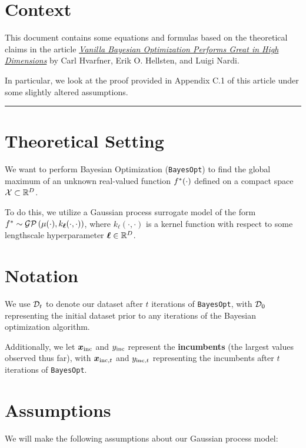 \documentclass[11pt]{article}
\numberwithin{figure}{section}
\numberwithin{equation}{section}
\def\BayesOpt{\texttt{BayesOpt}}
\def\calGP{\mathcal{GP}}
\newcommand{\bs}[1]{\boldsymbol{#1}}
\def\bell{\bs{\ell}}
\begin{document}
\section{Context}

This document contains some equations and formulas based on the theoretical claims in the article \href{https://arxiv.org/abs/2402.02229}{\textit{Vanilla Bayesian Optimization Performs Great in High Dimensions}} by Carl Hvarfner, Erik O. Hellsten, and Luigi Nardi.

In particular, we look at the proof provided in Appendix C.1 of this article under some slightly altered assumptions.

\noindent\rule{\textwidth}{0.8pt}

\section{Theoretical Setting}

We want to perform Bayesian Optimization (\BayesOpt) to find the global maximum of an unknown real-valued function $f^{*}(\cdot)$ defined on a compact space $\mathcal{X} \subset \mathbb{R}^{D}$.

To do this, we utilize a Gaussian process surrogate model of the form $\fstar \sim \calGP\left(\mu(\cdot), k_{\bell}(\cdot, \cdot)\right)$, where $k_{\bell}(\cdot, \cdot)$ is a kernel function with respect to some lengthscale hyperparameter $\bell \in \bbR^{D}$.

\section{Notation}

We use $\mathcal{D}_{t}$ to denote our dataset after $t$ iterations of \BayesOpt, with $\mathcal{D}_{0}$ representing the initial dataset prior to any iterations of the Bayesian optimization algorithm. 

Additionally, we let $\xinc$ and $\yinc$ represent the \textbf{incumbents} (the largest values observed thus far), with $\xinc[t]$ and $\yinc[t]$ representing the incumbents after $t$ iterations of \BayesOpt. 

\section{Assumptions}

We will make the following assumptions about our Gaussian process model:
\end{document}
